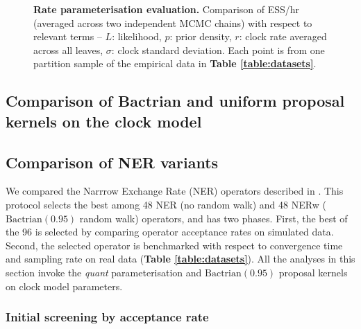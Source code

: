 \documentclass[10pt,letterpaper]{article}
\begin{document}





\begin{figure}[!h]
\caption{\textbf{Rate parameterisation evaluation.} Comparison of ESS/hr (averaged across two independent MCMC chains) with respect to relevant terms -- $L$: likelihood, $p$: prior density, $r$: clock rate averaged across all leaves, $\sigma$: clock standard deviation. Each point is from one partition sample of the empirical data in \textbf{Table \ref{table:datasets}}.  }
\label{fig:parameterisationResults}
\end{figure}







\subsection*{Comparison of Bactrian and uniform proposal kernels on the clock model}



\subsection*{Comparison of NER variants}

We compared the Narrrow Exchange Rate (NER) operators described in \textbf{}. This protocol selects the best among 48 NER (no random walk) and 48 NERw ($\text{Bactrian}(0.95)$ random walk) operators, and has two phases. First, the best of the 96 is selected by comparing operator acceptance rates on simulated data. Second, the selected operator is benchmarked with respect to convergence time and sampling rate on real data (\textbf{Table \ref{table:datasets}}). All the analyses in this section invoke the \textit{quant} parameterisation and $\text{Bactrian}(0.95)$ proposal kernels on clock model parameters.




\subsubsection*{Initial screening by acceptance rate}
\end{document}
